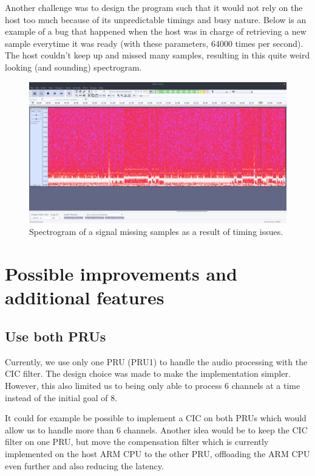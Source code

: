 \documentclass[]{report}
\begin{document}
Another challenge was to design the program such that it would not rely on the host too much because of its unpredictable timings and busy nature. Below is an example of a bug that happened when the host was in charge of retrieving a new sample everytime it was ready (with these parameters, 64000 times per second). The host couldn't keep up and missed many samples, resulting in this quite weird looking (and sounding) spectrogram.

\begin{figure}[h]
\centering
\includegraphics[width=1.0\linewidth]{Pictures/timing_bug.png}
\caption{Spectrogram of a signal missing samples as a result of timing
issues.}
\end{figure}

\hypertarget{possible-improvements-and-additional-features}{%
\chapter{Possible improvements and additional
features}\label{possible-improvements-and-additional-features}}

\hypertarget{use-both-prus}{%
\section{Use both PRUs}\label{use-both-prus}}

Currently, we use only one PRU (PRU1) to handle the audio processing with the CIC filter. The design choice was made to make the implementation simpler. However, this also limited us to being only able to process 6 channels at a time instead of the initial goal of 8.

It could for example be possible to implement a CIC on both PRUs which would allow us to handle more than 6 channels. Another idea would be to keep the CIC filter on one PRU, but move the compensation filter which is currently implemented on the host ARM CPU to the other PRU, offloading the ARM CPU even further and also reducing the latency.
\end{document}
